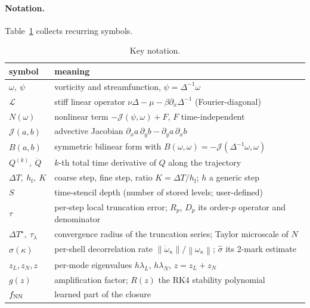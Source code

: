\documentclass[11pt]{article}
\theoremstyle{plain}
\theoremstyle{definition}
\newcommand{\Lop}{\mathcal{L}}
\newcommand{\Jop}{\mathcal{J}}
\newcommand{\DT}{\Delta T}
\newcommand{\DTs}{\Delta T^{\star}}
\newcommand{\hf}{h_{\mathrm{f}}}
\newcommand{\taul}{\tau_{\lambda}}
\newcommand{\norm}[1]{\left\lVert #1 \right\rVert}
\newcommand{\zL}{z_L}
\newcommand{\zN}{z_N}
\newcommand{\shat}{\hat{\sigma}}
\begin{document}
\paragraph{Notation.}
Table~\ref{tab:notation} collects recurring symbols.
\begin{table}[h]
\centering\small
\caption{Key notation.}
\label{tab:notation}
\begin{tabular}{ll}
\toprule
symbol & meaning \\
\midrule
$\omega,\ \psi$        & vorticity and streamfunction, $\psi=\Delta^{-1}\omega$ \\
$\Lop$                 & stiff linear operator $\nu\Delta-\mu-\beta\partial_x\Delta^{-1}$ (Fourier-diagonal) \\
$N(\omega)$            & nonlinear term $-\Jop(\psi,\omega)+F$, $F$ time-independent \\
$\Jop(a,b)$            & advective Jacobian $\partial_xa\,\partial_yb-\partial_ya\,\partial_xb$ \\
$B(a,b)$               & symmetric bilinear form with $B(\omega,\omega)=-\Jop(\Delta^{-1}\omega,\omega)$ \\
$Q^{(k)},\ \dot Q$     & $k$-th total time derivative of $Q$ along the trajectory \\
$\DT,\ \hf,\ K$        & coarse step, fine step, ratio $K=\DT/\hf$; $h$ a generic step \\
$S$                    & time-stencil depth (number of stored levels; user-defined) \\
$\tau$                 & per-step local truncation error; $R_p$, $D_p$ its order-$p$ operator and denominator \\
$\DTs,\ \taul$         & convergence radius of the truncation series; Taylor microscale of $N$ \\
$\sigma(\kappa)$       & per-shell decorrelation rate $\norm{\dot\omega_\kappa}/\norm{\omega_\kappa}$; $\shat$ its 2-mark estimate \\
$\zL,\zN,z$            & per-mode eigenvalues $h\lambda_L$, $h\lambda_N$, $z=\zL+\zN$ \\
$g(z)$                 & amplification factor; $R(z)$ the RK4 stability polynomial \\
$f_{\rm NN}$           & learned part of the closure \\
\bottomrule
\end{tabular}
\end{table}
\end{document}
